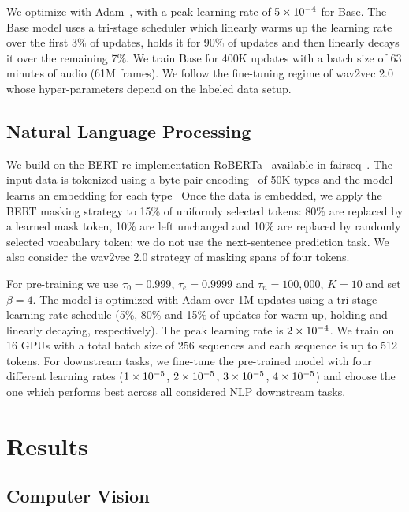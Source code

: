 \documentclass[nohyperref]{article}
\theoremstyle{plain}
\theoremstyle{definition}
\theoremstyle{remark}
\begin{document}
We optimize with Adam~\citep{kingma2015adam}, with a peak learning rate of $\Enot{5e-4}$ for \name{} Base. %
The Base model uses a tri-stage scheduler which linearly warms up the learning rate over the first 3\% of updates, holds it for 90\% of updates and then linearly decays it over the remaining 7\%. 
We train \name{} Base for 400K updates with a batch size of 63 minutes of audio (61M frames).
We follow the fine-tuning regime of wav2vec 2.0~\citep{baevski2020wav} whose hyper-parameters depend on the labeled data setup.


\subsection{Natural Language Processing}
\label{sec:setup_nlp}

We build on the BERT re-implementation RoBERTa~\citep{liu2019roberta} available in fairseq~\citep{ott2019fairseq}.
The input data is tokenized using a byte-pair encoding~\citep{sennrich2016bpe} of 50K types and the model learns an embedding for each type~\citep{devlin2018bert,liu2019roberta} 
Once the data is embedded, we apply the BERT masking strategy to 15\% of uniformly selected tokens: 
80\% are replaced by a learned mask token, 10\% are left unchanged and 10\% are replaced by randomly selected vocabulary token; we do not use the next-sentence prediction task. 
We also consider the wav2vec 2.0 strategy of masking spans of four tokens.

For pre-training we use $\tau_0=0.999$, $\tau_e=0.9999$ and $\tau_n=100,000$, $K=10$ and set $\beta=4$.
The model is optimized with Adam over 1M updates using a tri-stage learning rate schedule (5\%, 80\% and 15\% of updates for warm-up, holding and linearly decaying, respectively). 
The peak learning rate is $\Enot{2e-4}$.
We train on 16 GPUs with a total batch size of 256 sequences and each sequence is up to 512 tokens.
For downstream tasks, we fine-tune the pre-trained model with four different learning rates ($\Enot{1e-5}$, $\Enot{2e-5}$, $\Enot{3e-5}$, $\Enot{4e-5}$) and choose the one which performs best across all considered NLP downstream tasks.


\section{Results}
\label{sec:results}

\subsection{Computer Vision}
\label{sec:results_cv}
\end{document}
